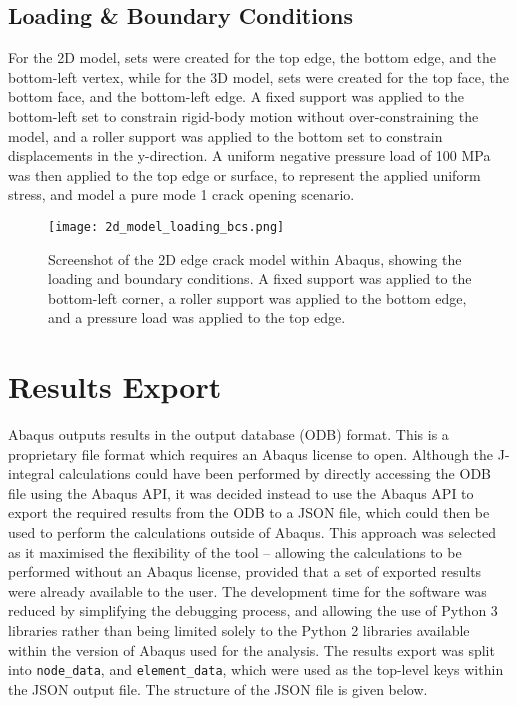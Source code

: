 \subsection{Loading \& Boundary Conditions}

For the 2D model, sets were created for the top edge, the bottom edge, and the bottom-left vertex, while for the 3D model, sets were created for the top face, the bottom face, and the bottom-left edge. A fixed support was applied to the bottom-left set to constrain rigid-body motion without over-constraining the model, and a roller support was applied to the bottom set to constrain displacements in the y-direction. A uniform negative pressure load of 100 MPa was then applied to the top edge or surface, to represent the applied uniform stress, and model a pure mode 1 crack opening scenario.

\begin{figure}[H]
	\centering
	\texttt{[image: 2d\_model\_loading\_bcs.png]}
	\caption{Screenshot of the 2D edge crack model within Abaqus, showing the loading and boundary conditions. A fixed support was applied to the bottom-left corner, a roller support was applied to the bottom edge, and a pressure load was applied to the top edge.}
	\label{fig:2d_fea_model_loading_bcs}
\end{figure}


\newpage
\section{Results Export}

Abaqus outputs results in the output database (ODB) format. This is a proprietary file format which requires an Abaqus license to open. Although the J-integral calculations could have been performed by directly accessing the ODB file using the Abaqus API, it was decided instead to use the Abaqus API to export the required results from the ODB to a JSON file, which could then be used to perform the calculations outside of Abaqus. This approach was selected as it maximised the flexibility of the tool -- allowing the calculations to be performed without an Abaqus license, provided that a set of exported results were already available to the user. The development time for the software was reduced by simplifying the debugging process, and allowing the use of Python 3 libraries rather than being limited solely to the Python 2 libraries available within the version of Abaqus used for the analysis. The results export was split into \texttt{node\_data}, and \texttt{element\_data}, which were used as the top-level keys within the JSON output file. The structure of the JSON file is given below.

